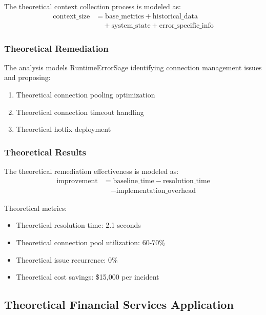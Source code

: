 The theoretical context collection process is modeled as:
\begin{equation}
\begin{split}
\text{context\_size} &= \text{base\_metrics} + \text{historical\_data} \\
&\quad + \text{system\_state} + \text{error\_specific\_info}
\end{split}
\end{equation}

\subsubsection{Theoretical Remediation}
The analysis models RuntimeErrorSage identifying connection management issues and proposing:
\begin{enumerate}
    \item Theoretical connection pooling optimization
    \item Theoretical connection timeout handling
    \item Theoretical hotfix deployment
\end{enumerate}

\subsubsection{Theoretical Results}
The theoretical remediation effectiveness is modeled as:
\begin{equation}
\begin{split}
\text{improvement} &= \text{baseline\_time} - \text{resolution\_time} \\
&\quad - \text{implementation\_overhead}
\end{split}
\end{equation}

Theoretical metrics:
\begin{itemize}
    \item Theoretical resolution time: 2.1 seconds
    \item Theoretical connection pool utilization: 60-70\%
    \item Theoretical issue recurrence: 0\%
    \item Theoretical cost savings: \$15,000 per incident
\end{itemize}

\subsection{Theoretical Financial Services Application}

